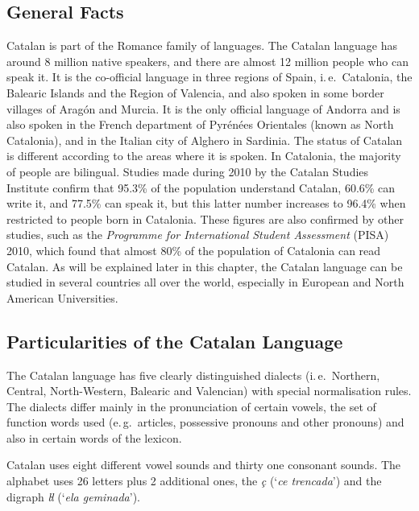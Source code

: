 \begin{multicols}{2}

\subsection{General Facts}

    Catalan is part of the Romance family of languages. The Catalan language has around 8 million native speakers, and there are almost 12 million people who can speak it. It is the co-official language in three regions of Spain, i.\,e.~Catalonia, the Balearic Islands and the Region of Valencia, and also spoken in some border villages of Aragón and Murcia.  It is the only official language of Andorra and is also spoken in the French department of Pyrénées Orientales (known as North Catalonia), and in the Italian city of Alghero in Sardinia.
The status of Catalan is different according to the areas where it is spoken. In Catalonia, the majority of people are bilingual. Studies made during 2010 by the Catalan Studies Institute confirm that 95.3\% of the population understand Catalan, 60.6\% can write it, and 77.5\% can speak it, but this latter number increases to 96.4\% when restricted to people born in Catalonia. These figures are also confirmed by other studies, such as the \textit{Programme for International Student Assessment} (PISA)  2010, which found that almost 80\% of the population of Catalonia can read Catalan. 
As will be explained later in this chapter, the Catalan language can be studied in several countries all over the world, especially in European and North American Universities.


\subsection{Particularities of the Catalan Language}

The Catalan language has five clearly distinguished dialects (i.\,e.~Northern, Central, North-Western, Balearic and Valencian) with special normalisation rules. The dialects differ mainly in the pronunciation of certain vowels, the set of function words used (e.\,g.~articles, possessive pronouns and other pronouns) and also in certain words of the lexicon. 

Catalan uses eight different vowel sounds and thirty one consonant sounds. The alphabet uses 26 letters plus 2 additional ones, the \textit{ç} (‘\textit{ce trencada}’) and the digraph \textit{ŀl} (‘\textit{ela geminada}’).


\end{multicols}
